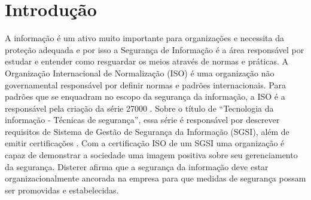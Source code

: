 \chapter{\label{chap:intro}Introdução}
%
%



%
%
%
%
%
   

A informação é um ativo muito importante para organizações e necessita da proteção adequada e por isso a Segurança de Informação é a área responsável por estudar e entender como resguardar os meios através de normas e práticas. A Organização Internacional de Normalização (ISO) é uma organização não governamental responsável por definir normas e padrões internacionais. Para padrões que se enquadram no escopo da segurança da informação, a ISO é a responsável pela criação da série 27000 \cite{caio2019}. Sobre o título de “Tecnologia da informação - Técnicas de segurança”, essa série é responsável por descrever requisitos de Sistema de Gestão de Segurança da Informação (SGSI), além de emitir certificações \cite{disterer2013}. Com a certificação ISO de um SGSI uma organização é capaz de demonstrar a sociedade uma imagem positiva sobre seu gerenciamento da segurança. Disterer \cite{disterer2013} afirma que a segurança da informação deve estar organizacionalmente ancorada na empresa para que medidas de segurança possam ser promovidas e estabelecidas. 

